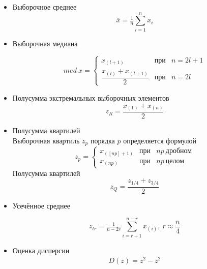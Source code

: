 \begin{itemize}
    \item Выборочное среднее
    \begin{equation}
        \overline{x} = \tfrac{1}{n}\sum_{i = 1}^{n}x_i
        \label{eq6}
    \end{equation}
    \item Выборочная медиана
    
       \begin{equation}
med\ x = \left\{
\begin{array}{ccl}
x_{(l + 1)} & \text{при} & n = 2l + 1\\
\dfrac{x_{(l)} + x_{(l + 1)}}{2} & \text{при} & n = 2l
\end{array}
\right.
\label{eq7}
\end{equation}
    
    \item Полусумма экстремальных выборочных элементов
    \begin{equation}
        z_{R} = \frac{x_{(1)} + x_{(n)}}{2}
        \label{eq8}
    \end{equation}
    \item Полусумма квартилей\\
    Выборочная квартиль $z_{p}$ порядка $p$ определяется формулой
    \begin{equation}
        z_{p} = \left\{
\begin{array}{ccl}
x_{([np]+ 1)} & \text{при} & np\ \text{дробном}\\
x_{(np)} & \text{при} & np\ \text{целом}
\end{array}
\right.
\label{eq9}
    \end{equation}
    Полусумма квартилей\\
    \begin{equation}
        z_{Q} = \dfrac{z_{1/4} + z_{3/4}}{2}
        \label{eq10}
    \end{equation}
    \item Усечённое среднее
    
    \begin{equation}
        z_{tr} = \tfrac{1}{n - 2r}\sum_{i = r + 1}^{n - r}x_{(i)},\ r\approx\dfrac{n}{4}
        \label{eq11}
    \end{equation}
    \item Оценка дисперсии
    \begin{equation}
        D(z) = \overline{z^2} - \overline{z}^2
        \label{eq12}
    \end{equation}
\end{itemize}

